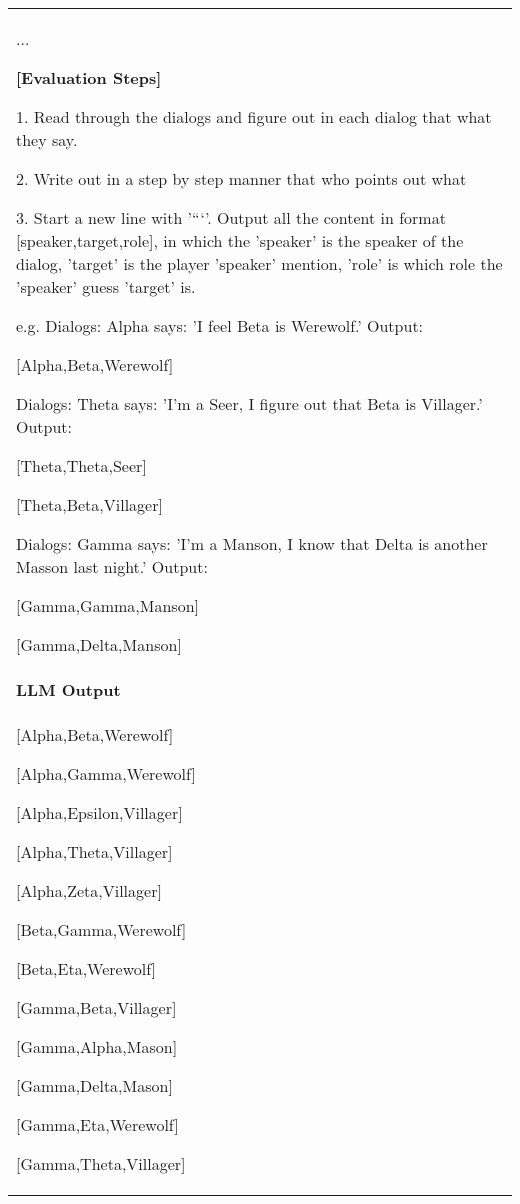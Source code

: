\begin{table*}[ht]
{\begin{tabular}{p{16cm}}
{    ...

    \textbf{[Evaluation Steps]}

    1. Read through the dialogs and figure out in each dialog that what they say.

    2. Write out in a step by step manner that who points out what 
    
    3. Start a new line with '```'. Output all the content in format [speaker,target,role], in which the 'speaker' is the speaker of the dialog, 'target' is the player 'speaker' mention, 'role' is which role the 'speaker' guess 'target' is.
    
    e.g.
    Dialogs:
    Alpha says: 'I feel Beta is Werewolf.'
    Output:

    [Alpha,Beta,Werewolf]
    
    Dialogs:
    Theta says: 'I'm a Seer, I figure out that Beta is Villager.'
    Output:

    [Theta,Theta,Seer]

    [Theta,Beta,Villager]
    
    Dialogs:
    Gamma says: 'I'm a Manson, I know that Delta is another Masson last night.'
    Output:

    [Gamma,Gamma,Manson]

    [Gamma,Delta,Manson]
    }

    \\ 

    \rowcolor[gray]{0.95} \vspace*{-8pt} {\fontsize{10pt}{12pt}\selectfont \bf LLM Output } \vspace*{2pt} \\

    {\ttfamily\small

    [Alpha,Beta,Werewolf]

    [Alpha,Gamma,Werewolf]

    [Alpha,Epsilon,Villager]

    [Alpha,Theta,Villager]

    [Alpha,Zeta,Villager]
    
    [Beta,Gamma,Werewolf]

    [Beta,Eta,Werewolf]
    
    [Gamma,Beta,Villager]

    [Gamma,Alpha,Mason]

    [Gamma,Delta,Mason]

    [Gamma,Eta,Werewolf]

    [Gamma,Theta,Villager]
    
}
\end{tabular}}
\end{table*}
